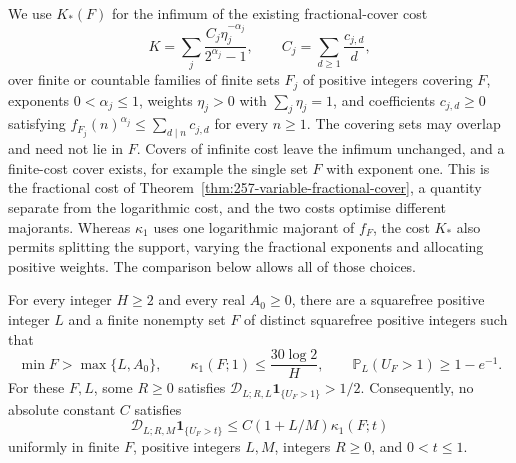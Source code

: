 We use $K_*(F)$ for the infimum of the existing fractional-cover cost
\begin{equation}
 K=\sum_j\frac{C_j\eta_j^{-\alpha_j}}{2^{\alpha_j}-1},\qquad
 C_j=\sum_{d\ge1}\frac{c_{j,d}}d,
 \label{eq:257-optimised-cover-cost}
\end{equation}
over finite or countable families of finite sets $F_j$ of positive integers covering
$F$, exponents $0<\alpha_j\le1$, weights $\eta_j>0$ with
$\sum_j\eta_j=1$, and coefficients $c_{j,d}\ge0$ satisfying
$f_{F_j}(n)^{\alpha_j}\le\sum_{d\mid n}c_{j,d}$ for every $n\ge1$.
The covering sets may overlap and need not lie in $F$.  Covers of infinite
cost leave the infimum unchanged, and a finite-cost cover exists, for example
the single set $F$ with exponent one.  This is the fractional cost of
Theorem~\ref{thm:257-variable-fractional-cover}, a quantity separate from
the logarithmic cost, and the two costs optimise different majorants.
Whereas $\kappa_1$ uses one logarithmic majorant of $f_F$, the cost $K_*$ also permits
splitting the support, varying the fractional exponents and allocating
positive weights. The comparison below allows all of those choices.

\begin{thm}\label{thm:257-logarithmic-counterexample}
For every integer $H\ge2$ and every real $A_0\ge0$, there are a
squarefree positive integer $L$ and a finite nonempty set $F$ of distinct
squarefree positive integers such that
\[
 \min F>\max\{L,A_0\},\qquad
 \kappa_1(F;1)\le\frac{30\log2}{H},\qquad
 \mathbb P_L(U_F>1)\ge1-e^{-1}.
\]
For these $F,L$, some $R\ge0$ satisfies
$\mathscr D_{L;R,L}\mathbf1_{\{U_F>1\}}>1/2$.
Consequently, no absolute constant $C$ satisfies
\begin{equation*}
 \mathscr D_{L;R,M}\mathbf1_{\{U_F>t\}}
 \le C(1+L/M)\kappa_1(F;t)
 \tag{E}
\end{equation*}
uniformly in finite $F$, positive integers $L,M$, integers $R\ge0$,
and $0<t\le1$.
\end{thm}

